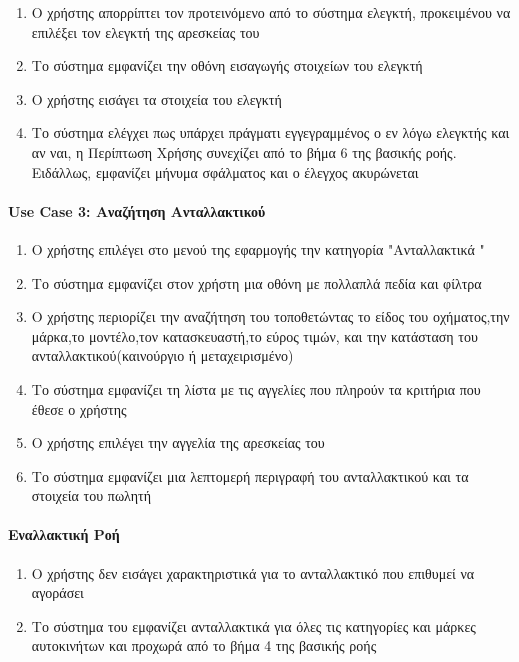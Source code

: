\documentclass{../ol-softwaremanual}
\begin{document}
	\begin{enumerate}
		\item Ο χρήστης απορρίπτει τον προτεινόμενο από το σύστημα ελεγκτή, προκειμένου να επιλέξει τον ελεγκτή της αρεσκείας του
		\item Το σύστημα εμφανίζει την οθόνη εισαγωγής στοιχείων του ελεγκτή
		\item Ο χρήστης εισάγει τα στοιχεία του ελεγκτή
		\item Το σύστημα ελέγχει πως υπάρχει πράγματι εγγεγραμμένος ο εν λόγω ελεγκτής και αν ναι, η Περίπτωση Χρήσης συνεχίζει από το βήμα 6 της βασικής ροής. Ειδάλλως, εμφανίζει μήνυμα σφάλματος και ο έλεγχος ακυρώνεται	
	\end{enumerate}	
	
	
	
	\paragraph{\en Use Case 3: \gr Αναζήτηση Ανταλλακτικού}	
	
	\begin{enumerate}
		\item Ο χρήστης επιλέγει στο μενού της εφαρμογής την κατηγορία  \en"\gr Ανταλλακτικά \en"\gr
		\item Το σύστημα εμφανίζει στον χρήστη μια οθόνη με πολλαπλά πεδία και φίλτρα
		\item Ο χρήστης περιορίζει την αναζήτηση του τοποθετώντας το είδος του οχήματος,την μάρκα,το μοντέλο,τον κατασκευαστή,το εύρος τιμών, και την κατάσταση του ανταλλακτικού(καινούργιο ή μεταχειρισμένο) 
		\item Το σύστημα εμφανίζει τη λίστα με τις αγγελίες που πληρούν τα κριτήρια που έθεσε ο χρήστης
		\item Ο χρήστης επιλέγει την αγγελία της αρεσκείας του
		\item Το σύστημα εμφανίζει μια λεπτομερή περιγραφή του ανταλλακτικού και τα στοιχεία του πωλητή
		
	\end{enumerate}
	
	\paragraph{Εναλλακτική Ροή}
	
	\begin{enumerate}
		\item Ο χρήστης δεν εισάγει χαρακτηριστικά για το ανταλλακτικό που επιθυμεί να αγοράσει
		\item Το σύστημα του εμφανίζει ανταλλακτικά για όλες τις κατηγορίες και μάρκες αυτοκινήτων και προχωρά από το βήμα 4 της βασικής ροής
	\end{enumerate}
	
\end{document}
